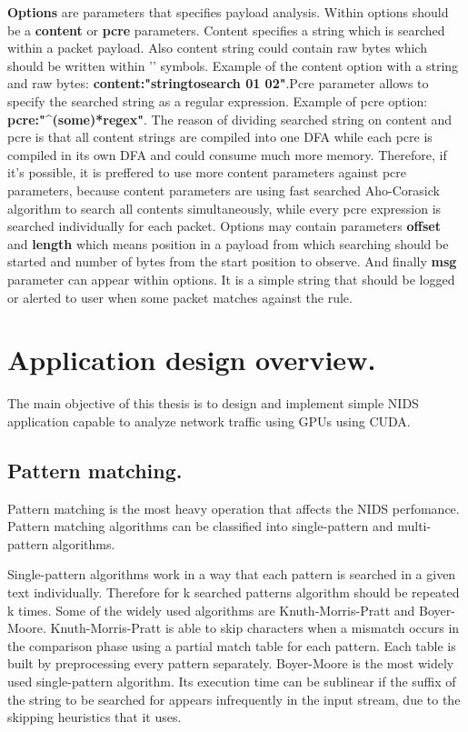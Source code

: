 \documentclass[thesis=M,english]{FITthesis}[2011/07/15]
\begin{document}
\textbf{Options} are parameters that specifies payload analysis. Within options should be a \textbf{content} or \textbf{pcre} parameters. Content specifies a string which is searched within a packet payload. Also content string could contain raw bytes which should be written within '\textbar' symbols. Example of the content option with a string and raw bytes: \textbf{content:"stringtosearch 01 02\textbar"}.\newline Pcre parameter allows to specify the searched string as a regular expression. Example of pcre option: \textbf{pcre:"\textasciicircum(some)*regex"}. The reason of dividing searched string on content and pcre is that all content strings are compiled into one DFA while each pcre is compiled in its own DFA and could consume much more memory. Therefore, if it's possible, it is preffered to use more content parameters against pcre parameters, because content parameters are using fast searched Aho-Corasick algorithm to search all contents simultaneously, while every pcre expression is searched individually for each packet. Options may contain parameters \textbf{offset} and \textbf{length} which means position in a payload from which searching should be started and number of bytes from the start position to observe. And finally \textbf{msg} parameter can appear within options. It is a simple string that should be logged or alerted to user when some packet matches against the rule.

\section{Application design overview.}
The main objective of this thesis is to design and implement simple NIDS application capable to analyze network traffic using GPUs using CUDA. 
\subsection*{Pattern matching.}
Pattern matching is the most heavy operation that affects the NIDS perfomance. Pattern matching algorithms can be classified into single-pattern and multi-pattern algorithms.

Single-pattern algorithms work in a way that each pattern is searched in a given text individually. Therefore for k searched patterns algorithm should be repeated k times. Some of the widely used algorithms are Knuth-Morris-Pratt\cite{kmp} and Boyer-Moore\cite{boyermoore}. Knuth-Morris-Pratt is able to skip characters when a mismatch occurs in the comparison phase using a partial match table for each pattern. Each table is built by preprocessing every pattern separately. Boyer-Moore is the most widely used single-pattern algorithm. Its execution time can be sublinear if the suffix of the string to be searched for appears infrequently in the input stream, due to the skipping heuristics that it uses.
\end{document}
